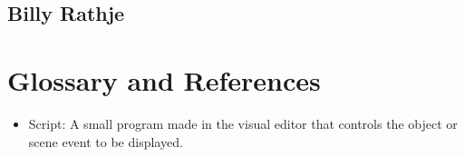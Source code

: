 \documentclass[12pt]{article}
\begin{document}
\subsection{Billy Rathje}

\section{Glossary and References}

\begin{itemize}
\item Script:  A small program made in the visual editor that controls the object or scene event to be displayed.
\end{itemize}
\end{document}
